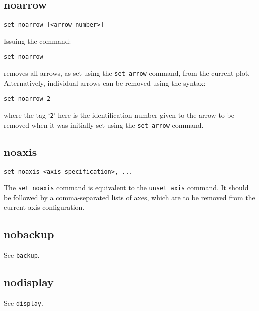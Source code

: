 \documentclass[a4paper,onecolumn,11pt]{book}
\begin{document}
\subsection{noarrow}

\begin{verbatim}
set noarrow [<arrow number>]
\end{verbatim}

Issuing the command:

\begin{verbatim}
set noarrow
\end{verbatim}

\noindent removes all arrows, as set using the {\tt set arrow} command, from the current
plot. Alternatively, individual arrows can be removed using the syntax:

\begin{verbatim}
set noarrow 2
\end{verbatim}

\noindent where the tag `{\tt 2}' here is the identification number given to
the arrow to be removed when it was initially set using the {\tt set arrow}
command.

\subsection{noaxis}

\begin{verbatim}
set noaxis <axis specification>, ...
\end{verbatim}

The {\tt set noaxis} command is equivalent to the {\tt unset axis} command. It
should be followed by a comma-separated lists of axes, which are to be removed
from the current axis configuration.


\subsection{nobackup}

See {\tt backup}.


\subsection{nodisplay}

See {\tt display}.
\end{document}
